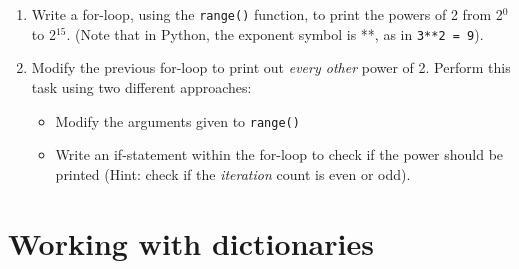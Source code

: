 \documentclass{article}[12pt]
\newcommand{\code}[1]{\texttt{#1}}  %
\begin{document}
\begin{enumerate}
	\item Write a for-loop, using the \code{range()} function, to print the powers of 2 from 2$^0$ to 2$^{15}$. (Note that in Python, the exponent symbol is **, as in \code{3**2 = 9}).
	
	\item Modify the previous for-loop to print out \emph{every other} power of 2. Perform this task using two different approaches:
	\begin{itemize}
	    \item Modify the arguments given to \code{range()}
	    \item Write an if-statement within the for-loop to check if the power should be printed (Hint: check if the \emph{iteration} count is even or odd).
	\end{itemize}

\end{enumerate}


\section{Working with dictionaries}
\end{document}
